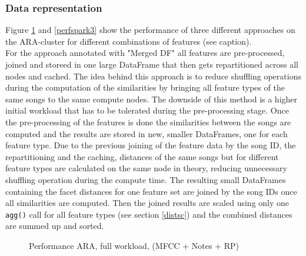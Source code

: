 \subsubsection{Data representation}

\noindent Figure \ref {perfspark2} and \ref{perfspark3} show the performance of three different approaches on the ARA-cluster for different combinations of features (see caption).\\
\noindent For the approach annotated with "Merged DF" all features are pre-processed, joined and storeed in one large DataFrame that then gets repartitioned across all nodes and cached. The idea behind this approach is to reduce shuffling operations during the computation of the similarities by bringing all feature types of the same songs to the same compute nodes. The downside of this method is a higher initial workload that has to be tolerated during the pre-processing stage. 
\noindent Once the pre-processing of the features is done the similarities between the songs are computed and the results are stored in new, smaller DataFrames, one for each feature type. Due to the previous joining of the feature data by the song ID, the repartitioning and the caching, distances of the same songs but for different feature types are calculated on the same node in theory, reducing unnecessary shuffling operation during the compute time. The resulting small DataFrames containing the facet distances for one feature set are joined by the song IDs once all similarities are computed. Then the joined results are scaled using only one \lstinline{agg()} call for all feature types (see section \ref{distsc}) and the combined distances are summed up and sorted.


\FloatBarrier
\begin{figure}[htbp]
	\centering
	\caption{Performance ARA, full workload, (MFCC + Notes + RP)}
	\label{perfspark2}
\end{figure}
\FloatBarrier

